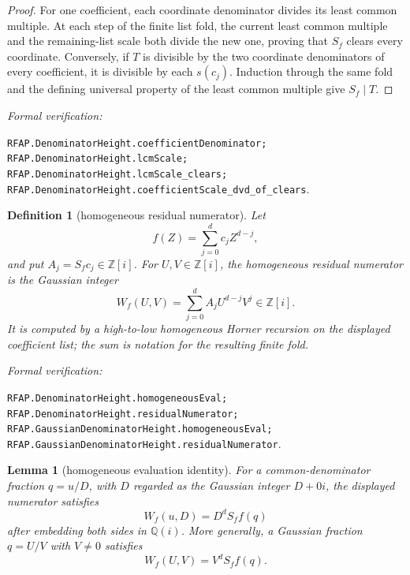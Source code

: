 \documentclass[11pt]{article}
\newtheorem{lemma}[lemma]{Lemma}
\newtheorem{definition}[definition]{Definition}
\newcommand{\Qi}{\mathbb{Q}(i)}
\newcommand{\Zi}{\mathbb{Z}[i]}
\newcommand{\leanref}[1]{\par\smallskip\noindent
  \emph{Formal verification:}\par\nobreak
  {\raggedright\nolinkurl{#1}.\par}}
\begin{document}
\begin{proof}
For one coefficient, each coordinate denominator divides its least common
multiple.  At each step of the finite list fold, the current least common
multiple and the remaining-list scale both divide the new one, proving that
$S_f$ clears every coordinate.  Conversely, if $T$ is divisible by the two
coordinate denominators of every coefficient, it is divisible by each
$s(c_j)$.  Induction through the same fold and the defining universal
property of the least common multiple give $S_f\mid T$.
\end{proof}

\leanref{RFAP.DenominatorHeight.coefficientDenominator;
RFAP.DenominatorHeight.lcmScale;
RFAP.DenominatorHeight.lcmScale_clears;
RFAP.DenominatorHeight.coefficientScale_dvd_of_clears}

\begin{definition}[homogeneous residual numerator]
\label{def:homogeneous-numerator}
Let
\[
 f(Z)=\sum_{j=0}^{d}c_jZ^{d-j},
\]
and put $A_j=S_fc_j\in\Zi$.  For $U,V\in\Zi$, the \emph{homogeneous residual
numerator} is the Gaussian integer
\begin{equation}
\label{eq:homogeneous-numerator}
 W_f(U,V)=\sum_{j=0}^{d}A_jU^{d-j}V^j\in\Zi.
\end{equation}
It is computed by a high-to-low homogeneous Horner recursion on the displayed
coefficient list; the sum is notation for the resulting finite fold.
\end{definition}

\leanref{RFAP.DenominatorHeight.homogeneousEval;
RFAP.DenominatorHeight.residualNumerator;
RFAP.GaussianDenominatorHeight.homogeneousEval;
RFAP.GaussianDenominatorHeight.residualNumerator}

\begin{lemma}[homogeneous evaluation identity]
\label{lem:homogeneous-evaluation}
For a common-denominator fraction $q=u/D$, with $D$ regarded as the Gaussian
integer $D+0i$, the displayed numerator satisfies
\begin{equation}
\label{eq:homogeneous-evaluation}
                        W_f(u,D)=D^dS_ff(q)
\end{equation}
after embedding both sides in $\Qi$.  More generally, a Gaussian fraction
$q=U/V$ with $V\ne0$ satisfies
\begin{equation}
\label{eq:gaussian-homogeneous-evaluation}
                        W_f(U,V)=V^dS_ff(q).
\end{equation}
\end{lemma}
\end{document}
